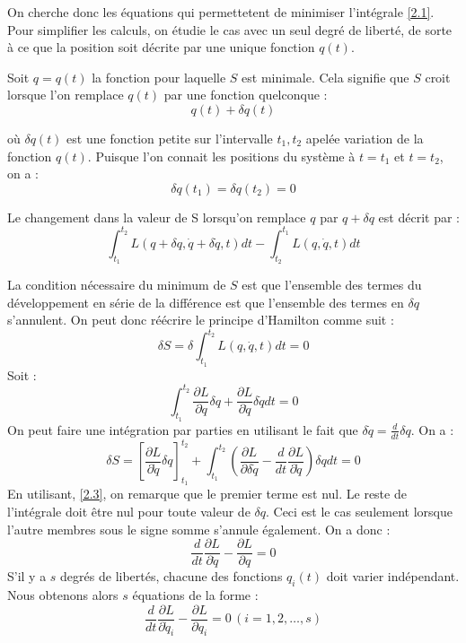 On cherche donc les équations qui permettetent de minimiser l'intégrale \autoref{2.1}. Pour simplifier les calculs, on étudie le cas avec un seul degré de liberté, de sorte à ce que la position soit décrite par une unique fonction \(q(t)\).\par
Soit \(q = q(t)\) la fonction pour laquelle \(S\) est minimale. Cela signifie que \(S\) croit lorsque l'on remplace \(q(t)\) par une fonction quelconque : 
\begin{equation}\label{2.2}
    q(t) + \delta q(t)
\end{equation}

où \(\delta q(t)\) est une fonction petite sur l'intervalle \(t_{1}, t_{2}\) apelée variation de la fonction \(q(t)\). Puisque l'on connait les positions du système à \(t=t_{1}\) et \(t = t_{2}\), on a : 
\begin{equation}
    \label{2.3}
    \delta  q(t_{1}) = \delta q(t_{2}) = 0
\end{equation}    

Le changement dans la valeur de S lorsqu'on remplace \(q\) par \(q + \delta q\) est décrit par : 
\[
    \int_{t_{1}}^{t_{2}} L(q+\delta q, \dot{q}+ \delta \dot{q},t) dt - \int_{t_{2}}^{t_{1}} L(q,\dot{q},t)  dt
\] 

La condition nécessaire du minimum de \(S\) est que l'ensemble des termes du développement en série de la différence est que l'ensemble des termes en \(\delta q\) s'annulent. On peut donc réécrire le principe d'Hamilton comme suit : 
\begin{equation}
    \label{2.4}
    \delta S = \delta \int_{t_{1}}^{t_{2}} L(q,\dot{q},t)  dt  =0
\end{equation} 
Soit : 
\[
    \int_{t_{1}}^{t_{2}} \frac{\partial L}{\partial q} \delta q + \frac{\partial L}{\partial \dot{q}} \delta \dot{q}  dt = 0
\]
On peut faire une intégration par parties en utilisant le fait que \(\delta \dot{q} = \frac{d}{dt}\delta q\). On a  :
\[
    \delta S = \left[ \frac{\partial L}{\partial \dot{q}} \delta q \right]^{t_{2}}_{t_{1}} + \int_{t_{1}}^{t_{2}} \left( \frac{\partial L}{\partial \delta \dot{q}} - \frac{d}{dt}\frac{\partial L}{\partial \dot{q}} \right) \delta q  dt = 0 
\] 
En utilisant, \autoref{2.3}, on remarque que le premier terme est nul. Le reste de l'intégrale doit être nul pour toute valeur de \(\delta q\). Ceci est le cas seulement lorsque l'autre membres sous le signe somme s'annule également. On a donc : 
\begin{equation}
    \label{2.5}
    \frac{d}{dt}\frac{\partial L}{\partial \dot{q}} - \frac{\partial L}{\partial q} = 0
\end{equation}
S'il y a \(s\) degrés de libertés, chacune des fonctions \(q_{i}(t)\) doit varier indépendant. Nous obtenons alors \(s\) équations de la forme : 
\begin{equation}
    \frac{d}{dt}\frac{\partial L}{\partial \dot{q}_{i}} - \frac{\partial L}{\partial q_{i}} = 0 \, (i = 1,2,\dots, s)
\end{equation} 

